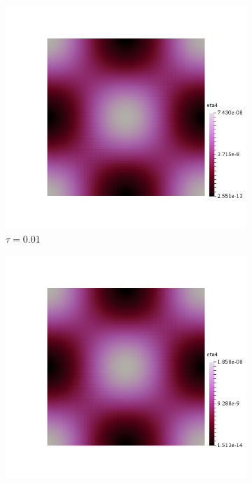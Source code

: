 \mbox{}\\ \\
\begin{figure}[h!]
  \centering
  \begin{subfigure}[b]{0.24\textwidth}
    \includegraphics[width=\textwidth,height=\textheight,keepaspectratio,height=\textheight,keepaspectratio]{figures/1_mpet/time/eta4_dt1.png}
    \caption{$\tau=0.01$}
  \end{subfigure}
  \begin{subfigure}[b]{0.24\textwidth}
    \includegraphics[width=\textwidth,height=\textheight,keepaspectratio,height=\textheight,keepaspectratio]{figures/1_mpet/time/eta4_dt2.png}

\end{subfigure}
\end{figure}
